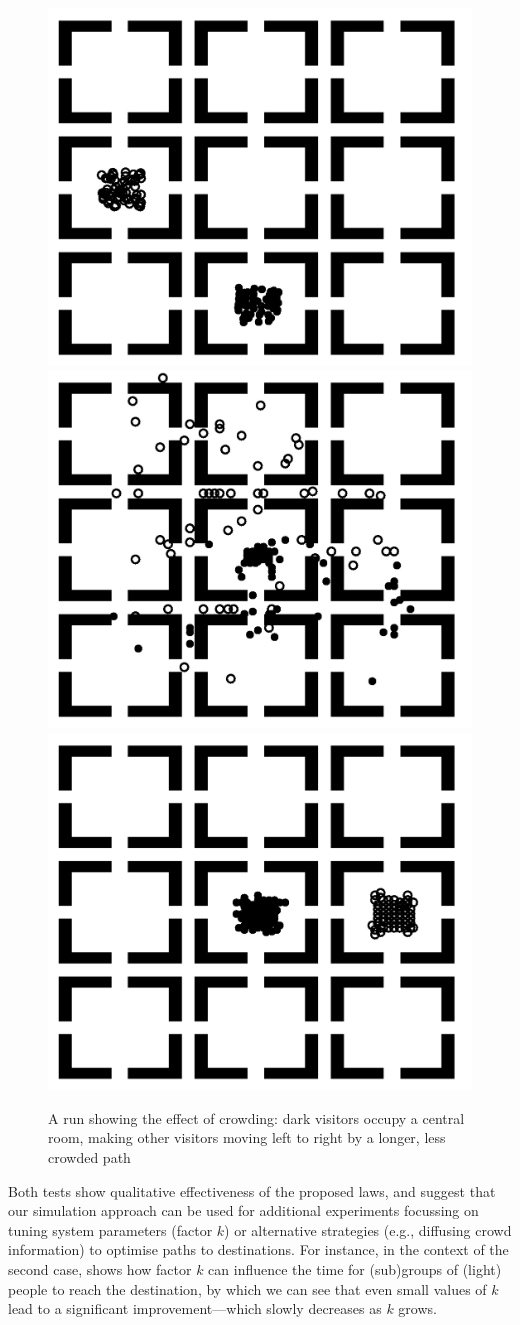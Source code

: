 \documentclass[12pt,a4paper,twoside,openright]{book}
\begin{document}
\begin{figure}
\begin{center}
    \includegraphics[width=0.3\columnwidth]{img/jos-snapshots/2-1}
    \includegraphics[width=0.3\columnwidth]{img/jos-snapshots/2-3}
    \includegraphics[width=0.3\columnwidth]{img/jos-snapshots/2-4}
    \caption[Effect of crowding]{A run showing the effect of crowding: dark visitors occupy a central room, making other visitors moving left to right by a longer, less crowded path \label{img:museum-generalmap2}}    
\end{center}
\end{figure}

Both tests show qualitative effectiveness of the proposed laws, and suggest that our simulation approach can be used for additional experiments focussing on tuning system parameters (factor $k$) or alternative strategies (e.g., diffusing crowd information) to optimise paths to destinations.
%
For instance, in the context of the second case,  shows how factor $k$ can influence the time for (sub)groups of (light) people to reach the destination, by which we can see that even small values of $k$ lead to a significant improvement---which slowly decreases as $k$ grows.
\end{document}
